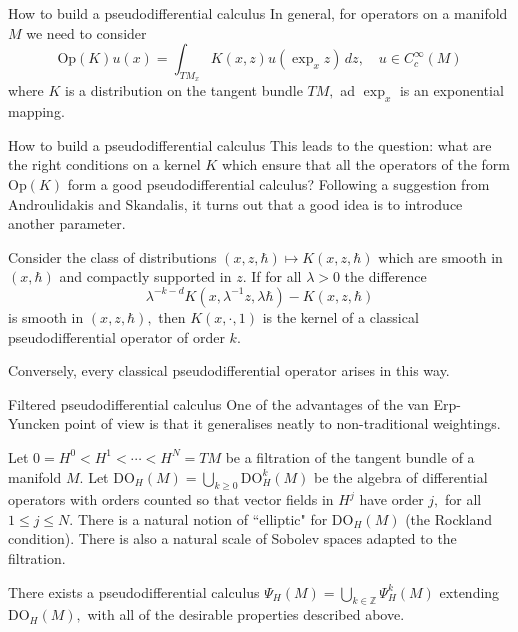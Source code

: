 \documentclass{beamer}
\numberwithin{equation}{section}
\theoremstyle{plain}
\theoremstyle{plain}
\theoremstyle{definition}
\theoremstyle{plain}
\theoremstyle{plain}
\theoremstyle{definition}
\newcommand{\Itgr}{\mathbb{Z}}
\newcommand{\Op}{\mathrm{Op}}
\begin{document}
\begin{frame}{How to build a pseudodifferential calculus}
    In general, for operators on a manifold $M$ we need to consider
    \[
        \Op(K)u(x) = \int_{TM_x} K(x,z)u(\exp_xz)\,dz,\quad u\in C^\infty_c(M)
    \]
    where $K$ is a distribution on the tangent bundle $TM,$ ad $\exp_x$ is an exponential mapping.
\end{frame}

\begin{frame}{How to build a pseudodifferential calculus}
    This leads to the question: what are the right conditions on a kernel $K$ which ensure that all the operators of the form $\Op(K)$ form a good pseudodifferential calculus? \pause
    Following a suggestion from Androulidakis and Skandalis, it turns out that a good idea is to introduce another parameter.
    \begin{theorem}
        Consider the class of distributions $(x,z,\hbar) \mapsto K(x,z,\hbar)$ which are smooth in $(x,\hbar)$ and compactly supported in $z.$ If for all $\lambda>0$ the difference
        \[
            \lambda^{-k-d}K(x,\lambda^{-1}z,\lambda \hbar)-K(x,z,\hbar)
        \]
        is smooth in $(x,z,\hbar),$ then $K(x,\cdot,1)$ is the kernel of a classical pseudodifferential operator of order $k.$
        
        Conversely, every classical pseudodifferential operator arises in this way.
    \end{theorem}
\end{frame}

\begin{frame}{Filtered pseudodifferential calculus}
    One of the advantages of the van Erp-Yuncken point of view is that it generalises neatly to non-traditional weightings. 
    \pause
    
    Let $0=H^0<H^1 < \cdots < H^N = TM$ be a filtration of the tangent bundle of a manifold $M.$ Let $\mathrm{DO}_H(M) = \bigcup_{k\geq 0} \mathrm{DO}_H^k(M)$ be the algebra of differential operators with orders counted so that vector fields in $H^j$ have order $j,$ for all $1\leq j\leq N.$ There is a natural notion of ``elliptic" for $\mathrm{DO}_H(M)$ (the Rockland condition). There is also a natural scale of Sobolev spaces adapted to the filtration.
        
    \begin{theorem}
        There exists a pseudodifferential calculus $\Psi_H(M) = \bigcup_{k\in \Itgr} \Psi^k_H(M)$ extending $\mathrm{DO}_H(M),$ 
        with all of the desirable properties described above.
    \end{theorem}
\end{frame}
\end{document}
